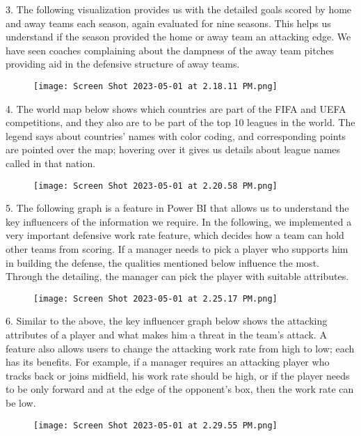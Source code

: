 \documentclass[lettersize]{IEEEtran}
\begin{document}
3. The following visualization provides us with the detailed goals scored by home and away teams each season, again evaluated for nine seasons. This helps us understand if the season provided the home or away team an attacking edge. We have seen coaches complaining about the dampness of the away team pitches providing aid in the defensive structure of away teams.
\begin{figure}[H]
    \centering
    \texttt{[image: Screen Shot 2023-05-01 at 2.18.11 PM.png]}
\end{figure}

4. The world map below shows which countries are part of the FIFA and UEFA competitions, and they also are to be part of the top 10 leagues in the world. The legend says about countries' names with color coding, and corresponding points are pointed over the map; hovering over it gives us details about league names called in that nation. 
\begin{figure}[H]
    \centering
    \texttt{[image: Screen Shot 2023-05-01 at 2.20.58 PM.png]}
\end{figure}

5. The following graph is a feature in Power BI that allows us to understand the key influencers of the information we require. In the following, we implemented a very important defensive work rate feature, which decides how a team can hold other teams from scoring. If a manager needs to pick a player who supports him in building the defense, the qualities mentioned below influence the most. Through the detailing, the manager can pick the player with suitable attributes. 
\begin{figure}[H]
    \centering
    \texttt{[image: Screen Shot 2023-05-01 at 2.25.17 PM.png]}
\end{figure}

6. Similar to the above, the key influencer graph below shows the attacking attributes of a player and what makes him a threat in the team’s attack. A feature also allows users to change the attacking work rate from high to low; each has its benefits. For example, if a manager requires an attacking player who tracks back or joins midfield, his work rate should be high, or if the player needs to be only forward and at the edge of the opponent's box, then the work rate can be low.
\begin{figure}[H]
    \centering
    \texttt{[image: Screen Shot 2023-05-01 at 2.29.55 PM.png]}
\end{figure}
\end{document}
